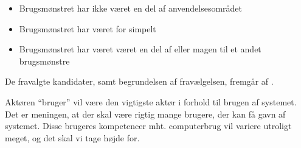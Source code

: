 \begin{itemize}[noitemsep]
\item Brugsmønstret har ikke været en del af anvendelsesområdet
\item Brugsmønstret har været for simpelt
\item Brugsmønstret har været været en del af eller magen til et andet brugsmønstre
\end{itemize}

De fravalgte kandidater, samt begrundelsen af fravælgelsen, fremgår af .

Aktøren ``bruger'' vil være den vigtigste aktør i forhold til brugen af systemet. Det er meningen, at der skal være rigtig mange brugere, der kan få gavn af systemet. Disse brugeres kompetencer mht. computerbrug vil variere utroligt meget, og det skal vi tage højde for.


